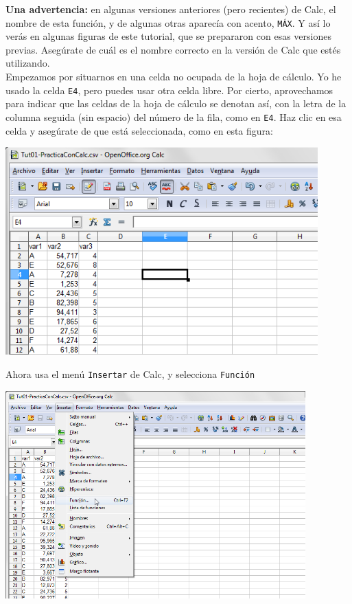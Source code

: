 \documentclass[10pt,a4paper]{article}\usepackage[]{graphicx}\usepackage[]{color}
\begin{document}
{\bf Una advertencia:} en algunas versiones anteriores (pero recientes) de Calc, el nombre de esta función, y de algunas otras aparecía con acento, {\tt MÁX}. Y así lo verás en algunas figuras de este tutorial, que se prepararon con esas versiones previas. Asegúrate de cuál es el nombre correcto en la versión de Calc que estés utilizando.\\

Empezamos por situarnos en una celda no ocupada de la hoja de cálculo. Yo he usado la celda {\tt E4}, pero puedes usar otra celda libre. Por cierto, aprovechamos para indicar que las celdas de la hoja de cálculo se denotan así, con la letra de la columna seguida (sin espacio) del número de la fila, como en {\tt E4}. Haz clic en esa celda y asegúrate de que está seleccionada, como en esta figura:
    \begin{center}
    \includegraphics[height=8cm]{../fig/Tut01-Calc-tablaFrec-02.png}
    \end{center}
Ahora usa el menú {\tt Insertar} de Calc, y selecciona {\tt Función}
    \begin{center}
    \includegraphics[height=8cm]{../fig/Tut01-Calc-tablaFrec-03.png}
    \end{center}
\end{document}

